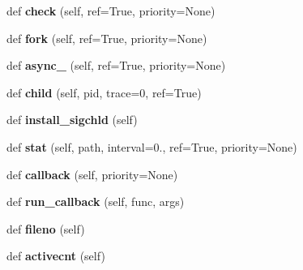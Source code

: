 \begin{DoxyCompactItemize}
\item 
\mbox{\label{classgevent_1_1__ffi_1_1loop_1_1_abstract_loop_a2f6004129563f001d0bad12c23ef1fc8}} 
def {\bfseries check} (self, ref=True, priority=None)
\item 
\mbox{\label{classgevent_1_1__ffi_1_1loop_1_1_abstract_loop_a252bdb5b8d2b353999d78d16a474eb02}} 
def {\bfseries fork} (self, ref=True, priority=None)
\item 
\mbox{\label{classgevent_1_1__ffi_1_1loop_1_1_abstract_loop_a3413ea3c59942133b086b793a3b492bb}} 
def {\bfseries async\+\_\+} (self, ref=True, priority=None)
\item 
\mbox{\label{classgevent_1_1__ffi_1_1loop_1_1_abstract_loop_af6ae3751c1a8c5635de0d7508237e131}} 
def {\bfseries child} (self, pid, trace=0, ref=True)
\item 
\mbox{\label{classgevent_1_1__ffi_1_1loop_1_1_abstract_loop_addc183d72c82b7e465522acd99bf80e0}} 
def {\bfseries install\+\_\+sigchld} (self)
\item 
\mbox{\label{classgevent_1_1__ffi_1_1loop_1_1_abstract_loop_a8bc6c09bf1ce7453e1147ce1700ea110}} 
def {\bfseries stat} (self, path, interval=0., ref=True, priority=None)
\item 
\mbox{\label{classgevent_1_1__ffi_1_1loop_1_1_abstract_loop_aa17ae6f16fe120a1d8cc41b72ae9212b}} 
def {\bfseries callback} (self, priority=None)
\item 
\mbox{\label{classgevent_1_1__ffi_1_1loop_1_1_abstract_loop_aef8ad1b4d842741b4d56784fdaa27d33}} 
def {\bfseries run\+\_\+callback} (self, func, args)
\item 
\mbox{\label{classgevent_1_1__ffi_1_1loop_1_1_abstract_loop_ae50c28b2da9ec011fb6166148ff31988}} 
def {\bfseries fileno} (self)
\item 
\mbox{\label{classgevent_1_1__ffi_1_1loop_1_1_abstract_loop_aff387342f6a2b6d2ded9d96560f50c32}} 
def {\bfseries activecnt} (self)
\end{DoxyCompactItemize}
